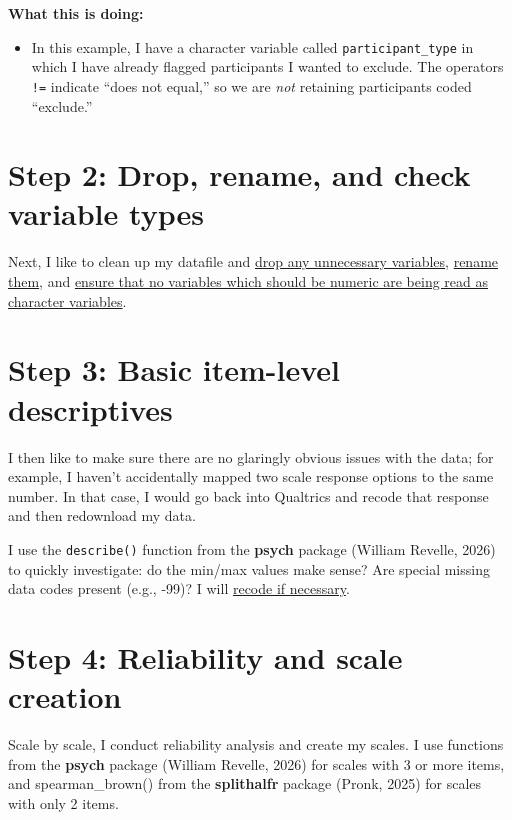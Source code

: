 \documentclass[
  letterpaper,
  DIV=11,
  numbers=noendperiod]{scrreprt}
\providecommand{\tightlist}{%
  \setlength{\itemsep}{0pt}\setlength{\parskip}{0pt}}\usepackage{longtable,booktabs,array}
\begin{document}
\textbf{What this is doing:}

\begin{itemize}
\tightlist
\item
  In this example, I have a character variable called
  \texttt{participant\_type} in which I have already flagged
  participants I wanted to exclude. The operators \texttt{!=} indicate
  ``does not equal,'' so we are \emph{not} retaining participants coded
  ``exclude.''
\end{itemize}

\section{Step 2: Drop, rename, and check variable
types}\label{step-2-drop-rename-and-check-variable-types}

Next, I like to clean up my datafile and
\href{load-specific-variables.qmd}{drop any unnecessary variables},
\href{renaming-variables.qmd}{rename them}, and
\href{check-variable-types.qmd}{ensure that no variables which should be
numeric are being read as character variables}.

\section{Step 3: Basic item-level
descriptives}\label{step-3-basic-item-level-descriptives}

I then like to make sure there are no glaringly obvious issues with the
data; for example, I haven't accidentally mapped two scale response
options to the same number. In that case, I would go back into Qualtrics
and recode that response and then redownload my data.

I use the \texttt{describe()} function from the \textbf{psych} package
(William Revelle, 2026) to quickly investigate: do the min/max values
make sense? Are special missing data codes present (e.g., -99)? I will
\href{recoding.qmd}{recode if necessary}.

\section{Step 4: Reliability and scale
creation}\label{step-4-reliability-and-scale-creation}

Scale by scale, I conduct reliability analysis and create my scales. I
use functions from the \textbf{psych} package (William Revelle, 2026)
for scales with 3 or more items, and spearman\_brown() from the
\textbf{splithalfr} package (Pronk, 2025) for scales with only 2 items.
\end{document}

